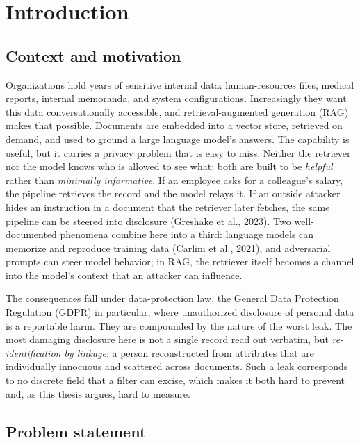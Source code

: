 \chapter{Introduction}
\label{ch:intro}

\section{Context and motivation}
\label{sec:intro-context}

Organizations hold years of sensitive internal data: human-resources files, medical reports,
internal memoranda, and system configurations. Increasingly they want this data conversationally
accessible, and retrieval-augmented generation (RAG) makes that possible. Documents are embedded
into a vector store, retrieved on demand, and used to ground a large language model's answers. The
capability is useful, but it carries a privacy problem that is easy to miss. Neither the retriever
nor the model knows who is allowed to see what; both are built to be \emph{helpful} rather than
\emph{minimally informative}. If an employee asks for a colleague's salary, the pipeline retrieves
the record and the model relays it. If an outside attacker hides an instruction in a document that
the retriever later fetches, the same pipeline can be steered into disclosure (Greshake et al., 2023).
Two well-documented phenomena combine here into a third: language models can memorize and reproduce
training data (Carlini et al., 2021), and adversarial prompts can steer model behavior; in
RAG, the retriever itself becomes a channel into the model's context that an attacker can influence.

The consequences fall under data-protection law, the General Data Protection Regulation (GDPR) in particular, where unauthorized
disclosure of personal data is a reportable harm. They are compounded by the nature of the worst
leak. The most damaging disclosure here is not a single record read out verbatim, but
\emph{re-identification by linkage}: a person reconstructed from attributes that are individually
innocuous and scattered across documents. Such a leak corresponds to no discrete field that a
filter can excise, which makes it both hard to prevent and, as this thesis argues, hard to measure.

\section{Problem statement}
\label{sec:intro-problem}

